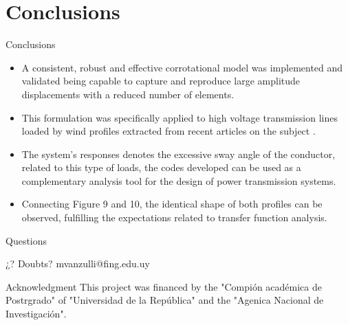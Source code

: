 \documentclass{beamer}
\begin{document}
\section[Conclusion ]{Conclusions}
\begin{frame}{Conclusions }
\begin{itemize}
 \item A consistent, robust and effective corrotational model was implemented and validated being capable to capture and reproduce large amplitude displacements with a reduced number of elements.
\pause 
 \item This formulation was specifically applied to high voltage transmission lines loaded by wind profiles extracted from recent articles on the subject \cite{Stengel2017a}.
 \pause
 \item The system's responses denotes the excessive sway angle of the conductor, related to this type of loads, the codes developed can be used as a complementary analysis tool for the design of power transmission systems. 
 \pause
 \item Connecting Figure 9 and 10, the identical shape of both profiles can be observed, fulfilling the expectations related to transfer function analysis. 
  
\end{itemize}
\end{frame}
\begin{frame}{Questions}

  \begin{block}{¿?}
 			  Doubts? mvanzulli@fing.edu.uy 
 		\end{block}
        
          \begin{block}{Acknowledgment}
 			   This project was financed by the "Compión académica de Postrgrado" of "Universidad de la República" and the "Agenica Nacional de Investigación".
 		\end{block}
\end{frame}


%
\end{document}
